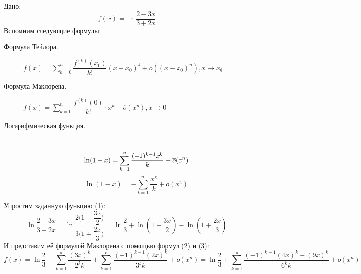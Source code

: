 \documentclass{article}
\begin{document}
\clearpage
Дано:
\begin{equation}
f(x)=\ln{\dfrac{2-3x}{3+2x}}
\end{equation}
Вспомним следующие формулы:
\begin{description}
    \item[Формула Тейлора.] $f(x) = \displaystyle\sum_{k=0}^{n}{\dfrac{f^{(k)}(x_0)}{k!}(x-x_0)^k} + \overline{o}((x-x_0)^n), x \to x_0$
    \item[Формула Маклорена.] $f(x) = \displaystyle\sum_{k=0}^{n}{\dfrac{f^(k)(0)}{k!} \cdot x^k} + \overline{o}(x^n), x \to 0$
    \item[Логарифмическая функция.] \, \\
        \begin{equation}
            \ln(1+x) = \displaystyle\sum_{k=1}^n \dfrac{(-1)^{k-1}x^k}{k} + \overline{o}(x^n) \\
        \end{equation}
        \begin{equation}
            \ln(1-x) = -\displaystyle\sum_{k=1}^n \dfrac{x^k}{k} + \overline{o}(x^n)
        \end{equation}
\end{description}
Упростим заданную функцию (1):
\begin{equation*}
    \ln{\dfrac{2-3x}{3+2x}} = \ln{\dfrac{2\Bigg(1-\dfrac{3x}{2}\Bigg)}{3\Bigg(1+\dfrac{2x}{3}\Bigg)}} = \ln\dfrac{2}{3} + \ln(1-\dfrac{3x}{2}) - \ln(1+\dfrac{2x}{3})
\end{equation*}
И представим её формулой Маклорена с помощью формул (2) и (3): \\
\begin{equation*}
    f(x) = \ln{\dfrac{2}{3}} - \displaystyle\sum_{k=1}^n \dfrac{(3x)^k}{2^k k} + \displaystyle\sum_{k=1}^n \dfrac{(-1)^{k-1}(2x)^k}{3^k k} + \overline{o}(x^n) =
    \ln{\dfrac{2}{3}} + \displaystyle\sum_{k=1}^n \dfrac{(-1)^{k-1}(4x)^k - (9x)^k}{6^k k} + \overline{o}(x^n)
\end{equation*}
\end{document}

